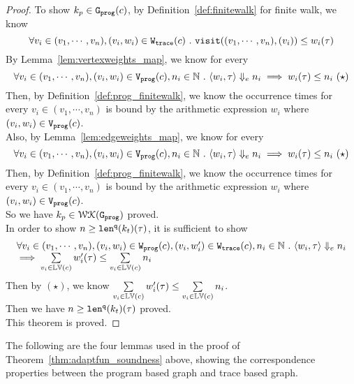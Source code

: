 \begin{proof}
To show $k_p \in \mathtt{{G_{prog}}}(c)$, by Definition~\ref{def:finitewalk} for finite walk, 
we know
\[
  \forall v_i \in (v_1, \cdots, v_n), (v_i, w_i) \in \mathtt{{W_{trace}}}(c) 
  ~.~
  \mathtt{visit}((v_1, \cdots, v_n), (v_i)) \leq w_i(\mathtt{\tau})
\]
%
By Lemma~\ref{lem:vertexweights_map}, we know for every 
\[
  \forall v_i \in (v_1, \cdots, v_n), (v_i, w_i) \in \progV(c),
   n_i \in \mathbb{N} 
  \st
  \config{w_i, \trace} \earrow n_i
  \implies
   w_i(\trace) \leq n_i ~ (\star)
\]
Then, by Definition~\ref{def:prog_finitewalk}, we know
the occurrence times for every $v_i \in (v_1, \cdots, v_n)$ 
is bound by the arithmetic expression $w_i$ where $(v_i, w_i) \in \mathtt{{V_{prog}}}(c)$.
\\
Also, by Lemma~\ref{lem:edgeweights_map}, we know for every 
\[
  \forall v_i \in (v_1, \cdots, v_n), (v_i, w_i) \in \progV(c),
   n_i \in \mathbb{N} 
  \st
  \config{w_i, \trace} \earrow n_i
  \implies
   w_i(\trace) \leq n_i ~ (\star)
\]
Then, by Definition~\ref{def:prog_finitewalk}, we know
the occurrence times for every $v_i \in (v_1, \cdots, v_n)$ 
is bound by the arithmetic expression $w_i$ where $(v_i, w_i) \in \mathtt{{V_{prog}}}(c)$.
\\
So we have $k_p \in \mathcal{WK}(\mathtt{{G_{prog}}})$ proved.
\\
In order to show $ n \geq \mathtt{len}^{\tt q}(k_t)(\mathtt{\tau}) $, it is sufficient to show
\[
  \begin{array}{l}
  \forall v_i \in (v_1, \cdots, v_n),
  (v_i, w_i) \in \mathtt{{W_{prog}}}(c), (v_i, w'_i) \in \mathtt{{W_{trace}}}(c), n_i \in \mathbb{N} 
  ~.~
  \langle w_i, \mathtt{\tau} \rangle \Downarrow_e n_i
  \\
  \implies
   \sum\limits_{v_i \in \mathbb{LV}(c)}
   w'_i(\mathtt{\tau}) 
   \leq 
   \sum\limits_{v_i \in \mathbb{LV}(c)}n_i 
  \end{array}
  \]
Then by $(\star)$, we know $  \sum\limits_{v_i \in \mathbb{LV}(c)} w'_i(\mathtt{\tau}) 
\leq 
\sum\limits_{v_i \in \mathbb{LV}(c)}n_i $.
\\
Then we have $ n \geq \mathtt{len}^{\tt q}(k_t)(\mathtt{\tau}) $ proved.
\\
This theorem is proved.
\end{proof}
The following are the four lemmas used in the proof of Theorem~\ref{thm:adaptfun_soundness} above,
showing the correspondence properties between the program based graph and trace based graph.
